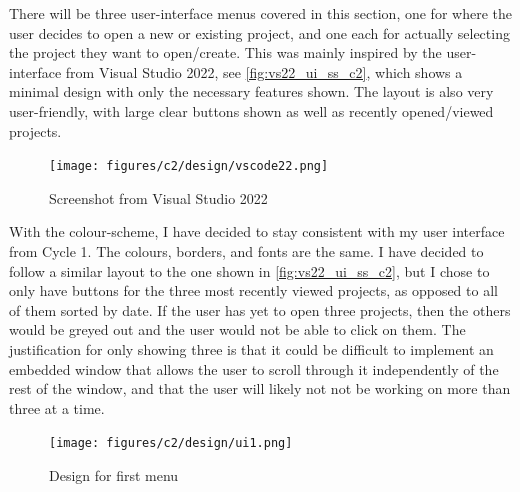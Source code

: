 \documentclass[11pt]{article}
\begin{document}
                There will be three user-interface menus covered in this section, one for where the user decides to open a new or existing project, and one each for actually selecting the project they want to open/create. 
                This was mainly inspired by the user-interface from Visual Studio 2022, see \autoref{fig:vs22_ui_ss_c2}, which shows a minimal design with only the necessary features shown.
                The layout is also very user-friendly, with large clear buttons shown as well as recently opened/viewed projects.

                \begin{figure}[!ht]
                    \centering
                    \texttt{[image: figures/c2/design/vscode22.png]}
                    \caption{Screenshot from Visual Studio 2022}
                    \label{fig:vs22_ui_ss_c2}
                \end{figure}

                With the colour-scheme, I have decided to stay consistent with my user interface from Cycle 1. The colours, borders, and fonts are the same. 
                I have decided to follow a similar layout to the one shown in \autoref{fig:vs22_ui_ss_c2}, but I chose to only have buttons for the three most recently viewed projects, as opposed to all of them sorted by date. 
                If the user has yet to open three projects, then the others would be greyed out and the user would not be able to click on them. 
                The justification for only showing three is that it could be difficult to implement an embedded window that allows the user to scroll through it independently of the rest of the window, and that the user will likely not not be working on more than three at a time. 

                \begin{figure}[!ht]
                    \centering
                    \texttt{[image: figures/c2/design/ui1.png]}
                    \caption{Design for first menu}
                    \label{fig:menu_1_design_c2}
                \end{figure}
\end{document}

